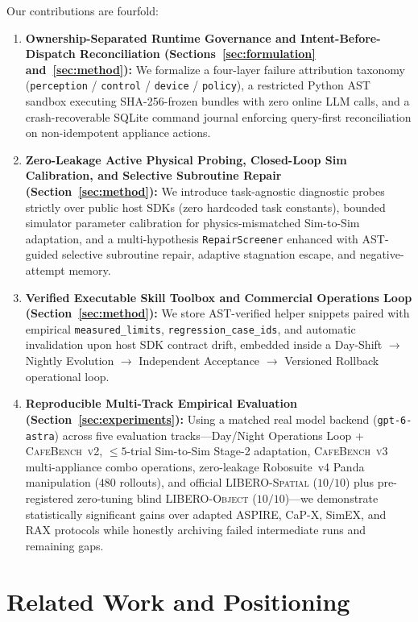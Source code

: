 \documentclass{trax}
\begin{document}
Our contributions are fourfold:
\begin{enumerate}
    \item \textbf{Ownership-Separated Runtime Governance and Intent-Before-Dispatch Reconciliation (Sections~\ref{sec:formulation} and~\ref{sec:method}):} We formalize a four-layer failure attribution taxonomy (\texttt{perception} / \texttt{control} / \texttt{device} / \texttt{policy}), a restricted Python AST sandbox executing SHA-256-frozen bundles with zero online LLM calls, and a crash-recoverable SQLite command journal enforcing query-first reconciliation on non-idempotent appliance actions.
    \item \textbf{Zero-Leakage Active Physical Probing, Closed-Loop Sim Calibration, and Selective Subroutine Repair (Section~\ref{sec:method}):} We introduce task-agnostic diagnostic probes strictly over public host SDKs (zero hardcoded task constants), bounded simulator parameter calibration for physics-mismatched Sim-to-Sim adaptation, and a multi-hypothesis \texttt{RepairScreener} enhanced with AST-guided selective subroutine repair, adaptive stagnation escape, and negative-attempt memory.
    \item \textbf{Verified Executable Skill Toolbox and Commercial Operations Loop (Section~\ref{sec:method}):} We store AST-verified helper snippets paired with empirical \texttt{measured\_limits}, \texttt{regression\_case\_ids}, and automatic invalidation upon host SDK contract drift, embedded inside a Day-Shift $\to$ Nightly Evolution $\to$ Independent Acceptance $\to$ Versioned Rollback operational loop.
    \item \textbf{Reproducible Multi-Track Empirical Evaluation (Section~\ref{sec:experiments}):} Using a matched real model backend (\texttt{gpt-6-astra}) across five evaluation tracks---Day/Night Operations Loop + \textsc{CafeBench~v2}, $\le 5$-trial Sim-to-Sim Stage-2 adaptation, \textsc{CafeBench~v3} multi-appliance combo operations, zero-leakage Robosuite~v4 Panda manipulation ($480$ rollouts), and official \textsc{LIBERO-Spatial} ($10/10$) plus pre-registered zero-tuning blind \textsc{LIBERO-Object} ($10/10$)---we demonstrate statistically significant gains over adapted ASPIRE, CaP-X, SimEX, and RAX protocols while honestly archiving failed intermediate runs and remaining gaps.
\end{enumerate}

\section{Related Work and Positioning}
\label{sec:related}
\end{document}
